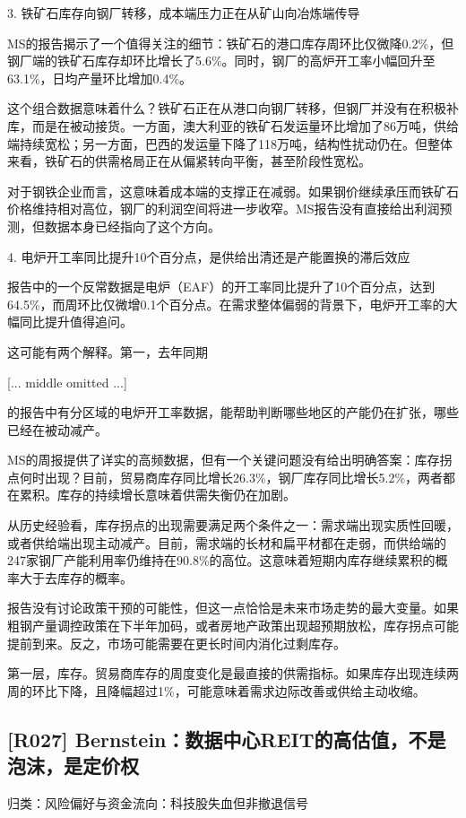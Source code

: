 \documentclass[11pt]{ctexart}
\begin{document}
3. 铁矿石库存向钢厂转移，成本端压力正在从矿山向冶炼端传导

MS的报告揭示了一个值得关注的细节：铁矿石的港口库存周环比仅微降0.2\%，但钢厂端的铁矿石库存却环比增长了5.6\%。同时，钢厂的高炉开工率小幅回升至63.1\%，日均产量环比增加0.4\%。

这个组合数据意味着什么？铁矿石正在从港口向钢厂转移，但钢厂并没有在积极补库，而是在被动接货。一方面，澳大利亚的铁矿石发运量环比增加了86万吨，供给端持续宽松；另一方面，巴西的发运量下降了118万吨，结构性扰动仍在。但整体来看，铁矿石的供需格局正在从偏紧转向平衡，甚至阶段性宽松。

对于钢铁企业而言，这意味着成本端的支撑正在减弱。如果钢价继续承压而铁矿石价格维持相对高位，钢厂的利润空间将进一步收窄。MS报告没有直接给出利润预测，但数据本身已经指向了这个方向。

4. 电炉开工率同比提升10个百分点，是供给出清还是产能置换的滞后效应

报告中的一个反常数据是电炉（EAF）的开工率同比提升了10个百分点，达到64.5\%，而周环比仅微增0.1个百分点。在需求整体偏弱的背景下，电炉开工率的大幅同比提升值得追问。

这可能有两个解释。第一，去年同期

[... middle omitted ...]

的报告中有分区域的电炉开工率数据，能帮助判断哪些地区的产能仍在扩张，哪些已经在被动减产。

MS的周报提供了详实的高频数据，但有一个关键问题没有给出明确答案：库存拐点何时出现？目前，贸易商库存同比增长26.3\%，钢厂库存同比增长5.2\%，两者都在累积。库存的持续增长意味着供需失衡仍在加剧。

从历史经验看，库存拐点的出现需要满足两个条件之一：需求端出现实质性回暖，或者供给端出现主动减产。目前，需求端的长材和扁平材都在走弱，而供给端的247家钢厂产能利用率仍维持在90.8\%的高位。这意味着短期内库存继续累积的概率大于去库存的概率。

报告没有讨论政策干预的可能性，但这一点恰恰是未来市场走势的最大变量。如果粗钢产量调控政策在下半年加码，或者房地产政策出现超预期放松，库存拐点可能提前到来。反之，市场可能需要在更长时间内消化过剩库存。

第一层，库存。贸易商库存的周度变化是最直接的供需指标。如果库存出现连续两周的环比下降，且降幅超过1\%，可能意味着需求边际改善或供给主动收缩。

\subsection{[R027] Bernstein：数据中心REIT的高估值，不是泡沫，是定价权}
{\small\color{refgray}归类：风险偏好与资金流向：科技股失血但非撤退信号}
\end{document}
